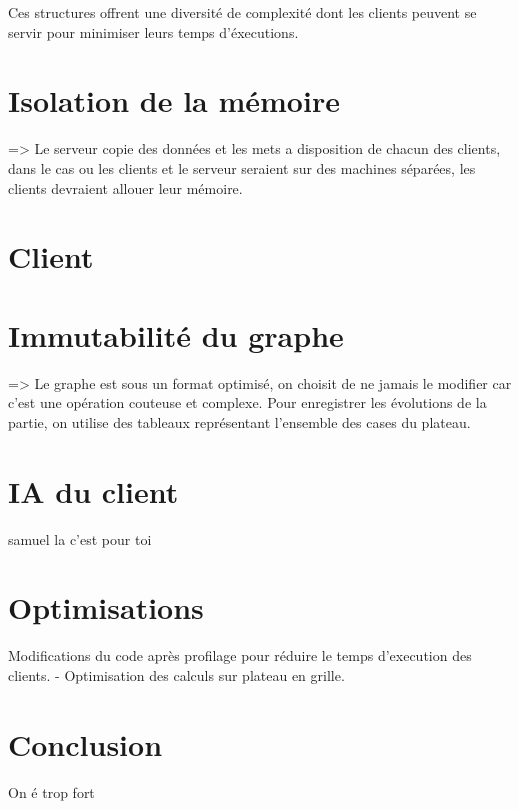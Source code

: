 \documentclass{article}
\begin{document}
Ces structures offrent une diversité de complexité dont les clients 
peuvent se servir pour minimiser leurs temps d'éxecutions.

\section{Isolation de la mémoire}
=> Le serveur copie des données et les mets a disposition de chacun
des clients, dans le cas ou les clients et le serveur seraient sur 
des machines séparées, les clients devraient allouer leur mémoire.


\section{Client}

\section{Immutabilité du graphe}
=> Le graphe est sous un format optimisé, on choisit de ne jamais 
le modifier car c'est une opération couteuse et complexe. Pour 
enregistrer les évolutions de la partie, on utilise des 
tableaux représentant l'ensemble des cases du plateau.


\section{IA du client}
samuel la c'est pour toi

\section{Optimisations}
Modifications du code après profilage pour réduire le temps 
d'execution des clients.
- Optimisation des calculs sur plateau en grille.


\section{Conclusion}
On é trop fort
\end{document}
